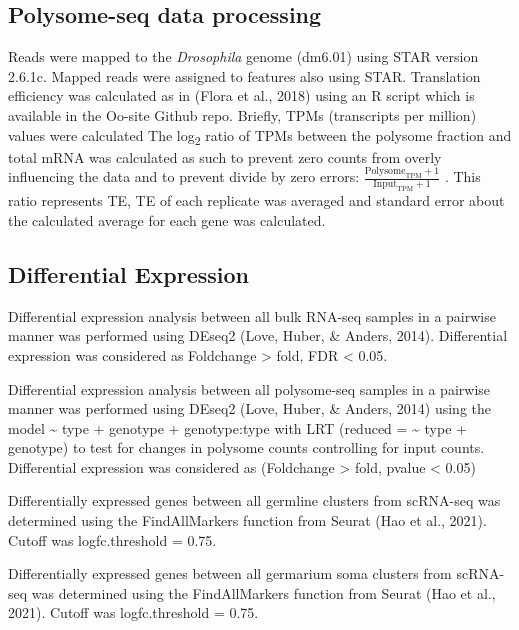 \documentclass[12pt,oneside]{reedthesis}
\begin{document}
\hypertarget{polysome-seq-data-processing}{%
\subsection{Polysome-seq data processing}\label{polysome-seq-data-processing}}

Reads were mapped to the \emph{Drosophila} genome (dm6.01) using STAR version
2.6.1c. Mapped reads were assigned to features also using STAR.
Translation efficiency was calculated as in (Flora et al., 2018) using
an R script which is available in the Oo-site Github repo. Briefly, TPMs
(transcripts per million) values were calculated The log\textsubscript{2} ratio of
TPMs between the polysome fraction and total mRNA was calculated as such
to prevent zero counts from overly influencing the data and to prevent
divide by zero errors:
\(\frac{\text{Polysome}_{\text{TPM}} + 1}{\text{Input}_{\text{TPM}} + 1}\)
. This ratio represents TE, TE of each replicate was averaged and
standard error about the calculated average for each gene was
calculated.

\hypertarget{differential-expression}{%
\subsection{Differential Expression}\label{differential-expression}}

Differential expression analysis between all bulk RNA-seq samples in a
pairwise manner was performed using DEseq2
(Love, Huber, \& Anders, 2014). Differential expression was
considered as Foldchange \textgreater{} \textbar{} fold, FDR \textless{} 0.05.

Differential expression analysis between all polysome-seq samples in a
pairwise manner was performed using DEseq2
(Love, Huber, \& Anders, 2014) using the model \textasciitilde{} type + genotype
+ genotype:type with LRT (reduced = \textasciitilde{} type + genotype) to test for
changes in polysome counts controlling for input counts. Differential
expression was considered as (Foldchange \textgreater{} \textbar{} fold, pvalue \textless{} 0.05)

Differentially expressed genes between all germline clusters from
scRNA-seq was determined using the FindAllMarkers function from Seurat
(Hao et al., 2021). Cutoff was logfc.threshold =
0.75.

Differentially expressed genes between all germarium soma clusters from
scRNA-seq was determined using the FindAllMarkers function from Seurat
(Hao et al., 2021). Cutoff was logfc.threshold =
0.75.
\end{document}
